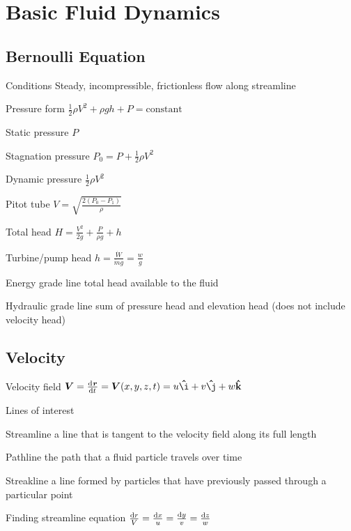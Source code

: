 \documentclass{article}
\begin{document}
\section{Basic Fluid Dynamics}

\subsection{Bernoulli Equation}
\label{sec:bernoulli-eq}
\begin{description*}
\item[Conditions] Steady, incompressible, frictionless flow along streamline
\item[Pressure form]
  \(\frac{1}{2}\rho V^2 + \rho g h + P = \text{constant}\)
\item[Static pressure]
  \(P\)
\item[Stagnation pressure]
  \(P_0 = P + \frac{1}{2}\rho V^2\)
\item[Dynamic pressure]
  \(\frac{1}{2}\rho V^2\)
\item[Pitot tube]
  \(V = \sqrt{\frac{2\left(P_0-P_1\right)}{\rho}}\)
\item[Total head]
  \(H = \frac{V^2}{2g} + \frac{P}{\rho g} + h\)
\item[Turbine\slash{}pump head]
  \(h = \frac{\dot{W}}{\dot{m} g} = \frac{w}{g}\)
\item[Energy grade line] total head available to the fluid
\item[Hydraulic grade line] sum of pressure head and elevation head (does not include velocity head)
\end{description*}

\subsection{Velocity}
\begin{description*}
\item[Velocity field]
  \(\vec{V} = \od{\vec{r}}{t} = \vec{V}(x,y,z,t)
  = u\uvec{\mrm{\i}}+v\uvec{\mrm{\j}} + w\uvec{\mrm{k}}\)
\item[Lines of interest]~
  \begin{description*}
  \item[Streamline] a line that is tangent to the velocity field along its full length
  \item[Pathline] the path that a fluid particle travels over time
  \item[Streakline] a line formed by particles that have previously passed through a particular point
  \end{description*}
\item[Finding streamline equation]
  \(\frac{\dif r}{V} = \frac{\dif x}{u} = \frac{\dif y}{v} = \frac{\dif z}{w}\)
\end{description*}
\end{document}

